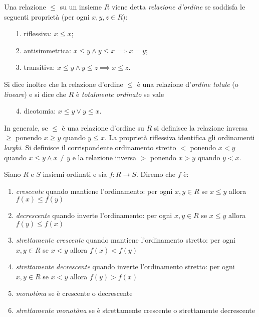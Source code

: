 \begin{definition}
  \label{def:ordine}%
  Una relazione
  $\le$ su un insieme $R$ viene detta
  \emph{relazione d'ordine}%
%
  se soddisfa le seguenti proprietà (per ogni $x,y,z\in R$):
  \begin{enumerate}
    \item[1.] riflessiva: $x\le x$;
    \item[2.] antisimmetrica: $x\le y \land y\le x \implies x=y$;
    \item[3.] transitiva: $x\le y \land y\le z \implies x\le z$.
  \end{enumerate}
  Si dice inoltre che la relazione d'ordine $\le$
  è una relazione d'\emph{ordine totale}
%
  (o \emph{lineare}) 
  e si dice che $R$ è \emph{totalmente ordinato} se vale
  \begin{enumerate}
    \item[4.] dicotomia: $x\le y \lor y\le x$.
  \end{enumerate}
\end{definition}

In generale, se $\le$ è una relazione d'ordine su $R$ si definisce la 
relazione inversa $\ge$ ponendo $x\ge y$ quando $y\le x$.
La proprietà riflessiva identifica gli ordinamenti \emph{larghi}.
Si definisce il corrispondente ordinamento stretto $<$
ponendo $x < y$ quando $x\le y \land x\neq y$
e la relazione inversa $>$ ponendo $x>y$ quando $y<x$.

\begin{definition}
  \label{def:monotonia}%
  Siano $R$ e $S$ insiemi ordinati 
  e sia $f\colon R\to S$.
  Diremo che $f$ è:
  \begin{enumerate}
    \item \emph{crescente} quando mantiene l'ordinamento: 
    per ogni $x,y\in R$ se $x\le y$ allora $f(x) \le f(y)$
    \item \emph{decrescente} quando inverte l'ordinamento: 
    per ogni $x,y\in R$ se $x\le y$ allora $f(y) \le f(x)$
    \item \emph{strettamente crescente} quando mantiene l'ordinamento stretto: 
    per ogni $x,y\in R$ se $x < y$ allora $f(x) < f(y)$
    \item \emph{strettamente decrescente} quando inverte l'ordinamento stretto: 
    per ogni $x,y\in R$ se $x < y$ allora $f(y) > f(x)$
    \item \emph{monotòna} se è crescente o decrescente
    \item \emph{strettamente monotòna} se è strettamente crescente 
    o strettamente decrescente
  \end{enumerate}
\end{definition}

